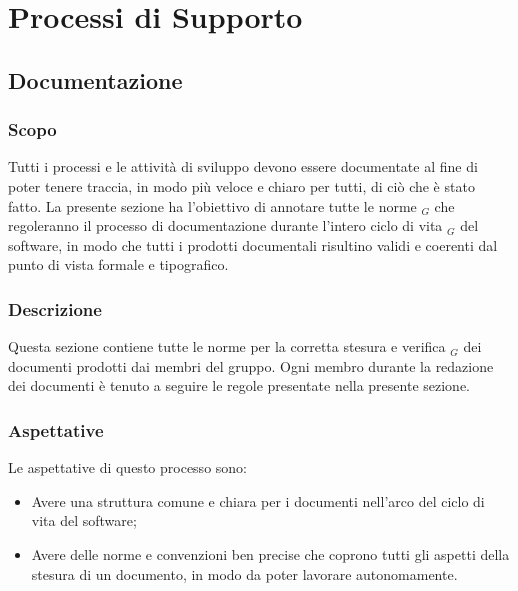 \chapter{Processi di Supporto}

\section{Documentazione}
\subsection{Scopo}
Tutti i processi e le attività di sviluppo devono essere documentate al fine di poter tenere traccia, in modo più veloce e chiaro per tutti, di ciò che è stato fatto. La presente sezione ha l'obiettivo di annotare tutte le norme $_G$ che regoleranno il processo di documentazione durante l'intero ciclo di vita $_G$ del software, in modo che tutti i prodotti documentali risultino validi e coerenti dal punto di vista formale e tipografico.
\subsection{Descrizione}
Questa sezione contiene tutte le norme per la corretta stesura e verifica $_G$ dei documenti prodotti dai membri del gruppo. Ogni membro durante la redazione dei documenti è tenuto a seguire le regole presentate nella presente sezione.
\subsection{Aspettative}
Le aspettative di questo processo sono:
\begin{itemize}
    \item Avere una struttura comune e chiara per i documenti nell'arco del ciclo di vita del software;
    \item Avere delle norme e convenzioni ben precise che coprono tutti gli aspetti della stesura di un
documento, in modo da poter lavorare autonomamente.
\end{itemize}
